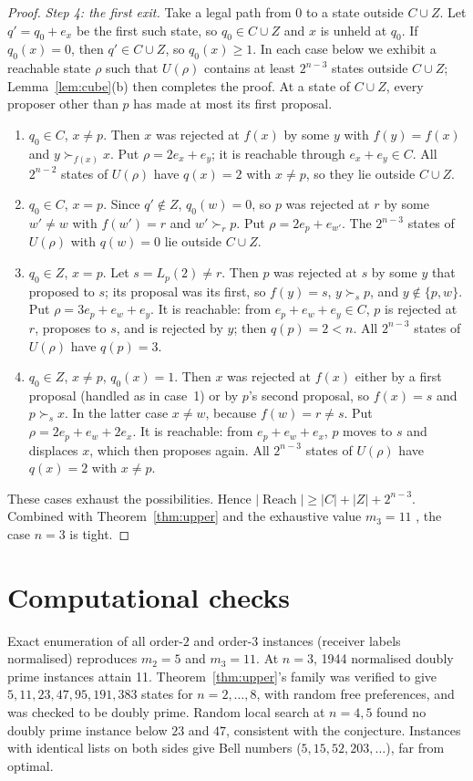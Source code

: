 \documentclass[11pt]{article}
\theoremstyle{definition}
\begin{document}
\begin{proof}
\emph{Step 4: the first exit.} Take a legal path from $0$ to a state outside $C\cup Z$. Let
$q'=q_0+e_x$ be the first such state, so $q_0\in C\cup Z$ and $x$ is unheld at $q_0$. If $q_0(x)=0$,
then $q'\in C\cup Z$, so $q_0(x)\ge1$. In each case below we exhibit a reachable state $\rho$ such that $U(\rho)$ contains at least
$2^{n-3}$ states outside $C\cup Z$; Lemma~\ref{lem:cube}(b) then completes the proof.
At a state of $C\cup Z$, every proposer other than $p$ has made at most its first proposal.
\begin{enumerate}
\item $q_0\in C$, $x\ne p$. Then $x$ was rejected at $f(x)$ by some $y$ with $f(y)=f(x)$ and $y\succ_{f(x)}x$.
Put $\rho=2e_x+e_y$; it is reachable through $e_x+e_y\in C$. All $2^{n-2}$ states of $U(\rho)$
have $q(x)=2$ with $x\ne p$, so they lie outside $C\cup Z$.
\item $q_0\in C$, $x=p$. Since $q'\notin Z$, $q_0(w)=0$, so $p$ was rejected at $r$ by some
$w'\ne w$ with $f(w')=r$ and $w'\succ_rp$. Put $\rho=2e_p+e_{w'}$. The $2^{n-3}$ states of
$U(\rho)$ with $q(w)=0$ lie outside $C\cup Z$.
\item $q_0\in Z$, $x=p$. Let $s=L_p(2)\ne r$. Then $p$ was rejected at $s$ by some $y$ that proposed
to $s$; its proposal was its first, so $f(y)=s$, $y\succ_sp$, and $y\notin\{p,w\}$.
Put $\rho=3e_p+e_w+e_y$. It is reachable: from $e_p+e_w+e_y\in C$, $p$ is rejected at $r$, proposes to $s$, and
is rejected by $y$; then $q(p)=2<n$. All $2^{n-3}$ states of $U(\rho)$ have $q(p)=3$.
\item $q_0\in Z$, $x\ne p$, $q_0(x)=1$. Then $x$ was rejected at $f(x)$ either by a first proposal (handled as in case~1)
or by $p$'s second proposal, so $f(x)=s$ and $p\succ_sx$. In the latter case $x\neq w$, because $f(w)=r\neq s$.
Put $\rho=2e_p+e_w+2e_x$. It is reachable: from $e_p+e_w+e_x$, $p$ moves to $s$ and displaces $x$, which then proposes again.
All $2^{n-3}$ states of $U(\rho)$ have $q(x)=2$ with $x\ne p$.
\end{enumerate}
These cases exhaust the possibilities. Hence $|\operatorname{Reach}|\ge|C|+|Z|+2^{n-3}$.
Combined with Theorem~\ref{thm:upper} and the exhaustive value $m_3=11$ \cite{ishida}, the case $n=3$ is tight.
\end{proof}

\section*{Computational checks}
Exact enumeration of all order-$2$ and order-$3$ instances (receiver labels normalised)
reproduces $m_2=5$ and $m_3=11$. At $n=3$, 1944 normalised doubly prime instances attain 11. Theorem~\ref{thm:upper}'s
family was verified to give $5,11,23,47,95,191,383$ states for $n=2,\dots,8$, with random free
preferences, and was checked to be doubly prime. Random local search at $n=4,5$ found
no doubly prime instance below $23$ and $47$, consistent with the conjecture. Instances with identical
lists on both sides give Bell numbers ($5,15,52,203,\dots$), far from optimal.
\end{document}
